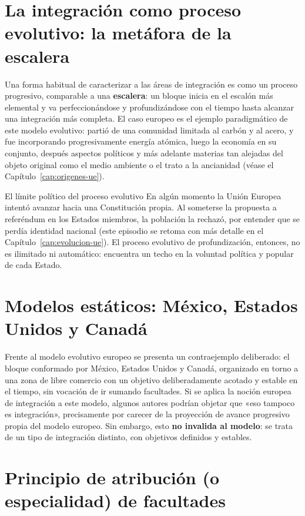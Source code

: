 \documentclass[12pt,oneside]{book}
\begin{document}
\section{La integración como proceso evolutivo: la metáfora de la escalera}

Una forma habitual de caracterizar a las áreas de integración es como un proceso progresivo, comparable a una \textbf{escalera}: un bloque inicia en el escalón más elemental y va perfeccionándose y profundizándose con el tiempo hasta alcanzar una integración más completa. El caso europeo es el ejemplo paradigmático de este modelo evolutivo: partió de una comunidad limitada al carbón y al acero, y fue incorporando progresivamente energía atómica, luego la economía en su conjunto, después aspectos políticos y más adelante materias tan alejadas del objeto original como el medio ambiente o el trato a la ancianidad (véase el Capítulo~\ref{cap:origenes-ue}).

\begin{ejemplo}{El límite político del proceso evolutivo}
En algún momento la Unión Europea intentó avanzar hacia una Constitución propia. Al someterse la propuesta a referéndum en los Estados miembros, la población la rechazó, por entender que se perdía identidad nacional (este episodio se retoma con más detalle en el Capítulo~\ref{cap:evolucion-ue}). El proceso evolutivo de profundización, entonces, no es ilimitado ni automático: encuentra un techo en la voluntad política y popular de cada Estado.
\end{ejemplo}

\section{Modelos estáticos: México, Estados Unidos y Canadá}

Frente al modelo evolutivo europeo se presenta un contraejemplo deliberado: el bloque conformado por México, Estados Unidos y Canadá, organizado en torno a una zona de libre comercio con un objetivo deliberadamente acotado y estable en el tiempo, sin vocación de ir sumando facultades. Si se aplica la noción europea de integración a este modelo, algunos autores podrían objetar que «eso tampoco es integración», precisamente por carecer de la proyección de avance progresivo propia del modelo europeo. Sin embargo, esto \textbf{no invalida al modelo}: se trata de un tipo de integración distinto, con objetivos definidos y estables.

\section{Principio de atribución (o especialidad) de facultades}
\end{document}
